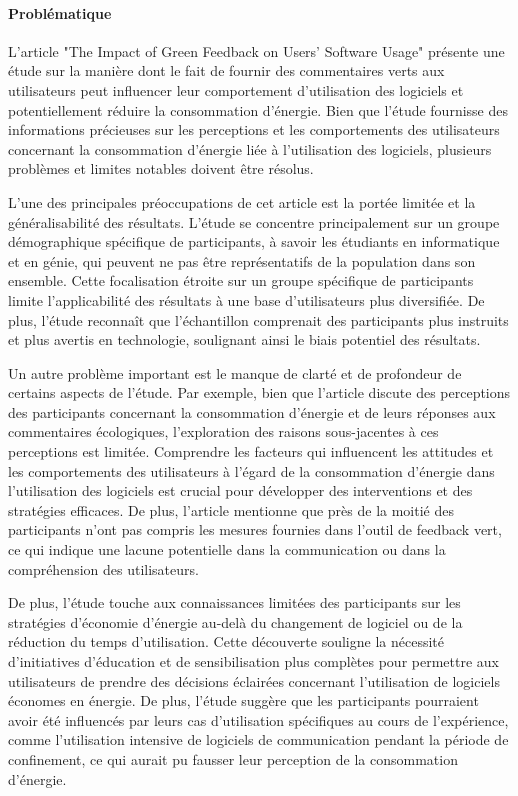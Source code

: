 \paragraph{Problématique}
L'article "The Impact of Green Feedback on Users’ Software Usage" présente une étude sur la manière dont le fait de fournir des commentaires verts aux utilisateurs peut influencer leur comportement d'utilisation des logiciels et potentiellement réduire la consommation d'énergie. Bien que l'étude fournisse des informations précieuses sur les perceptions et les comportements des utilisateurs concernant la consommation d'énergie liée à l'utilisation des logiciels, plusieurs problèmes et limites notables doivent être résolus.

L’une des principales préoccupations de cet article est la portée limitée et la généralisabilité des résultats. L’étude se concentre principalement sur un groupe démographique spécifique de participants, à savoir les étudiants en informatique et en génie, qui peuvent ne pas être représentatifs de la population dans son ensemble. Cette focalisation étroite sur un groupe spécifique de participants limite l'applicabilité des résultats à une base d'utilisateurs plus diversifiée. De plus, l’étude reconnaît que l’échantillon comprenait des participants plus instruits et plus avertis en technologie, soulignant ainsi le biais potentiel des résultats.

Un autre problème important est le manque de clarté et de profondeur de certains aspects de l’étude. Par exemple, bien que l'article discute des perceptions des participants concernant la consommation d'énergie et de leurs réponses aux commentaires écologiques, l'exploration des raisons sous-jacentes à ces perceptions est limitée. Comprendre les facteurs qui influencent les attitudes et les comportements des utilisateurs à l'égard de la consommation d'énergie dans l'utilisation des logiciels est crucial pour développer des interventions et des stratégies efficaces. De plus, l'article mentionne que près de la moitié des participants n'ont pas compris les mesures fournies dans l'outil de feedback vert, ce qui indique une lacune potentielle dans la communication ou dans la compréhension des utilisateurs.

De plus, l'étude touche aux connaissances limitées des participants sur les stratégies d'économie d'énergie au-delà du changement de logiciel ou de la réduction du temps d'utilisation. Cette découverte souligne la nécessité d'initiatives d'éducation et de sensibilisation plus complètes pour permettre aux utilisateurs de prendre des décisions éclairées concernant l'utilisation de logiciels économes en énergie. De plus, l’étude suggère que les participants pourraient avoir été influencés par leurs cas d’utilisation spécifiques au cours de l’expérience, comme l’utilisation intensive de logiciels de communication pendant la période de confinement, ce qui aurait pu fausser leur perception de la consommation d’énergie.

